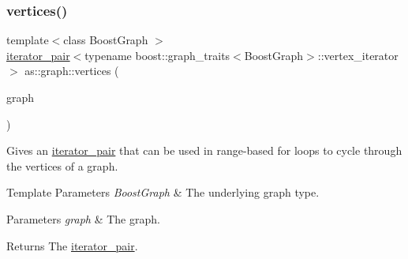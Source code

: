 \subsubsection{\texorpdfstring{vertices()}{vertices()}}
{\footnotesize\ttfamily template$<$class Boost\+Graph $>$ \\
\hyperlink{classas_1_1iterator__pair}{iterator\+\_\+pair}$<$typename boost\+::graph\+\_\+traits$<$Boost\+Graph$>$\+::vertex\+\_\+iterator$>$ as\+::graph\+::vertices (\begin{DoxyParamCaption}\item[{const Boost\+Graph \&}]{graph }\end{DoxyParamCaption})\hspace{0.3cm}{\ttfamily [inline]}}



Gives an \hyperlink{classas_1_1iterator__pair}{iterator\+\_\+pair} that can be used in range-\/based for loops to cycle through the vertices of a graph. 


\begin{DoxyTemplParams}{Template Parameters}
{\em Boost\+Graph} & The underlying graph type. \\
\hline
\end{DoxyTemplParams}

\begin{DoxyParams}{Parameters}
{\em graph} & The graph. \\
\hline
\end{DoxyParams}
\begin{DoxyReturn}{Returns}
The \hyperlink{classas_1_1iterator__pair}{iterator\+\_\+pair}. 
\end{DoxyReturn}
